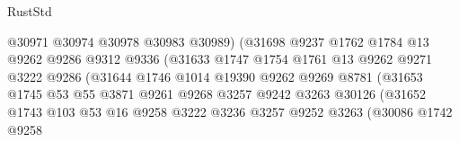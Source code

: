 \begin{lexlean}{RustStd}
\begin{coremodule}
                                      @30971
                                      @30974
                                      @30978
                                      @30983
                                      @30989)
                                    (@31698
                                      @9237
                                      @1762
                                      @1784
                                      @13
                                      @9262
                                      @9286
                                      @9312
                                      @9336
                                      (@31633
                                        @1747
                                        @1754
                                        @1761
                                        @13
                                        @9262
                                        @9271
                                        @3222
                                        @9286
                                        (@31644
                                          @1746
                                          @1014
                                          @19390
                                          @9262
                                          @9269
                                          @8781
                                          (@31653
                                            @1745
                                            @53
                                            @55
                                            @3871
                                            @9261
                                            @9268
                                            @3257
                                            @9242
                                            @3263
                                            @30126
                                            (@31652
                                              @1743
                                              @103
                                              @53
                                              @16
                                              @9258
                                              @3222
                                              @3236
                                              @3257
                                              @9252
                                              @3263
                                              (@30086
                                                @1742
                                                @9258

\end{coremodule}
\end{lexlean}
